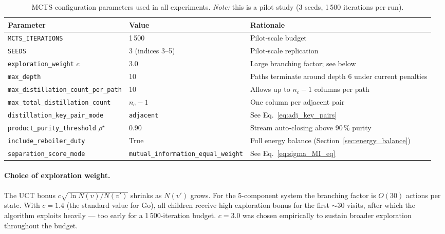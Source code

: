 \documentclass[11pt,a4paper]{article}
\theoremstyle{definition}
\theoremstyle{plain}
\begin{document}
\begin{table}[H]
\centering
\caption{MCTS configuration parameters used in all
 experiments. \emph{Note:} this is a pilot study
 (3 seeds, 1\,500 iterations per run).}
\label{tab:config}
\small
\begin{tabular}{@{}p{5.2cm}p{4.8cm}p{3.6cm}@{}}
\toprule
Parameter & Value & Rationale \\
\midrule
\texttt{MCTS\_ITERATIONS} & 1\,500 & Pilot-scale budget \\
\texttt{SEEDS} & 3 (indices 3--5) & Pilot-scale replication \\
\texttt{exploration\_weight} $c$ & 3.0 & Large branching factor; see below \\
\texttt{max\_depth} & 10 & Paths terminate around depth 6 under current penalties \\
\texttt{max\_distillation\_count}\newline\texttt{\_per\_path} & 10 & Allows up to $n_c-1$ columns per path \\
\texttt{max\_total\_distillation\_count} & $n_c-1$ & One column per adjacent pair \\
\texttt{distillation\_key\_pair\_mode} & \texttt{adjacent} & See Eq.~\eqref{eq:adj_key_pairs} \\
\texttt{product\_purity\_threshold} $\rho^\star$ & 0.90 & Stream auto-closing above 90\,\% purity \\
\texttt{include\_reboiler\_duty} & True & Full energy balance (Section~\ref{sec:energy_balance}) \\
\texttt{separation\_score\_mode} & \texttt{mutual\_information\_}\newline\texttt{equal\_weight} & See Eq.~\eqref{eq:sigma_MI_eq} \\
\bottomrule
\end{tabular}
\normalsize
\end{table}

\paragraph{Choice of exploration weight.}
The UCT bonus $c\sqrt{\ln N(v)/N(v')}$ shrinks as $N(v')$ grows. For the 5-component system the branching factor is $O(30)$ actions per state. With $c = 1.4$ (the standard value for Go), all children receive high exploration bonus for the first $\sim$30 visits, after which the algorithm exploits heavily — too early for a 1\,500-iteration budget. $c = 3.0$ was chosen empirically to sustain broader exploration throughout the budget.
\end{document}
